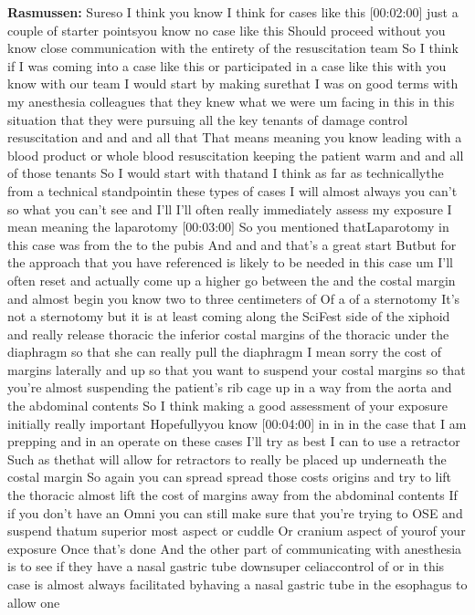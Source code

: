 \documentclass[
]{book}
\begin{document}
\textbf{Rasmussen:} Sureso I think you know I think for cases like this
{[}00:02:00{]} just a couple of starter pointsyou know no case like this
Should proceed without you know close communication with the entirety of
the resuscitation team So I think if I was coming into a case like this
or participated in a case like this with you know with our team I would
start by making surethat I was on good terms with my anesthesia
colleagues that they knew what we were um facing in this in this
situation that they were pursuing all the key tenants of damage control
resuscitation and and and all that That means meaning you know leading
with a blood product or whole blood resuscitation keeping the patient
warm and and all of those tenants So I would start with thatand I think
as far as technicallythe from a technical standpointin these types of
cases I will almost always you can't so what you can't see and I'll I'll
often really immediately assess my exposure I mean meaning the
laparotomy {[}00:03:00{]} So you mentioned thatLaparotomy in this case was
from the to the pubis And and and that's a great start Butbut for the
approach that you have referenced is likely to be needed in this case um
I'll often reset and actually come up a higher go between the and the
costal margin and almost begin you know two to three centimeters of Of a
of a sternotomy It's not a sternotomy but it is at least coming along
the SciFest side of the xiphoid and really release thoracic the inferior
costal margins of the thoracic under the diaphragm so that she can
really pull the diaphragm I mean sorry the cost of margins laterally and
up so that you want to suspend your costal margins so that you're almost
suspending the patient's rib cage up in a way from the aorta and the
abdominal contents So I think making a good assessment of your exposure
initially really important Hopefullyyou know {[}00:04:00{]} in in in the
case that I am prepping and in an operate on these cases I'll try as
best I can to use a retractor Such as thethat will allow for retractors
to really be placed up underneath the costal margin So again you can
spread spread those costs origins and try to lift the thoracic almost
lift the cost of margins away from the abdominal contents If if you
don't have an Omni you can still make sure that you're trying to OSE and
suspend thatum superior most aspect or cuddle Or cranium aspect of
yourof your exposure Once that's done And the other part of
communicating with anesthesia is to see if they have a nasal gastric
tube downsuper celiaccontrol of or in this case is almost always
facilitated byhaving a nasal gastric tube in the esophagus to allow one
\end{document}
